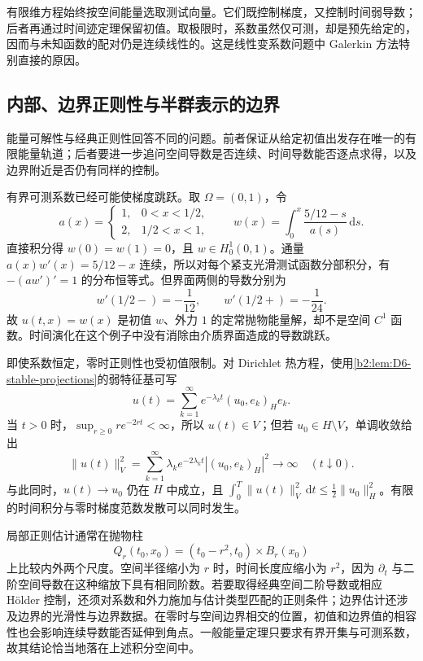 有限维方程始终按空间能量选取测试向量。它们既控制梯度，又控制时间弱导数；后者再通过时间迹定理保留初值。取极限时，系数虽然仅可测，却是预先给定的，因而与未知函数的配对仍是连续线性的。这是线性变系数问题中 Galerkin 方法特别直接的原因。

\subsection{内部、边界正则性与半群表示的边界}
\label{b2:subsec:D20605}

能量可解性与经典正则性回答不同的问题。前者保证从给定初值出发存在唯一的有限能量轨道；后者要进一步追问空间导数是否连续、时间导数能否逐点求得，以及边界附近是否仍有同样的控制。

\ProseParagraphBreak

有界可测系数已经可能使梯度跳跃。取 \(\Omega=(0,1)\)，令
\[
 a(x)=\begin{cases}1,&0<x<1/2,\\2,&1/2<x<1,\end{cases}
 \qquad
 w(x)=\int_0^x\frac{5/12-s}{a(s)}\,\mathrm ds.
\]
直接积分得 \(w(0)=w(1)=0\)，且 \(w\in H_0^1(0,1)\)。通量 \(a(x)w'(x)=5/12-x\) 连续，所以对每个紧支光滑测试函数分部积分，有 \(-(aw')'=1\) 的分布恒等式。但界面两侧的导数分别为
\[
 w'(1/2-)=-\frac1{12},\qquad w'(1/2+)=-\frac1{24}.
\]
故 \(u(t,x)=w(x)\) 是初值 \(w\)、外力 \(1\) 的定常抛物能量解，却不是空间 \(C^1\) 函数。时间演化在这个例子中没有消除由介质界面造成的导数跳跃。

\ProseParagraphBreak

即使系数恒定，零时正则性也受初值限制。对 Dirichlet 热方程，使用\cref{b2:lem:D6-stable-projections}的弱特征基可写
\[
 u(t)=\sum_{k=1}^\infty e^{-\lambda_kt}(u_0,e_k)_H e_k.
\]
当 \(t>0\) 时，\(\sup_{r\geq0}r e^{-2rt}<\infty\)，所以 \(u(t)\in V\)；但若 \(u_0\in H\setminus V\)，单调收敛给出
\[
 \|u(t)\|_V^2
 =\sum_{k=1}^\infty\lambda_ke^{-2\lambda_kt}|(u_0,e_k)_H|^2
 \longrightarrow\infty\quad(t\downarrow0).
\]
与此同时，\(u(t)\to u_0\) 仍在 \(H\) 中成立，且 \(\int_0^T\|u(t)\|_V^2\,\mathrm dt\leq\frac12\|u_0\|_H^2\)。有限的时间积分与零时梯度范数发散可以同时发生。

\ProseParagraphBreak

局部正则估计通常在抛物柱
\[
 Q_r(t_0,x_0)=(t_0-r^2,t_0)\times B_r(x_0)
\]
上比较内外两个尺度。空间半径缩小为 \(r\) 时，时间长度应缩小为 \(r^2\)，因为 \(\partial_t\) 与二阶空间导数在这种缩放下具有相同阶数。若要取得经典空间二阶导数或相应 Hölder 控制，还须对系数和外力施加与估计类型匹配的正则条件；边界估计还涉及边界的光滑性与边界数据。在零时与空间边界相交的位置，初值和边界值的相容性也会影响连续导数能否延伸到角点。一般能量定理只要求有界开集与可测系数，故其结论恰当地落在上述积分空间中。

